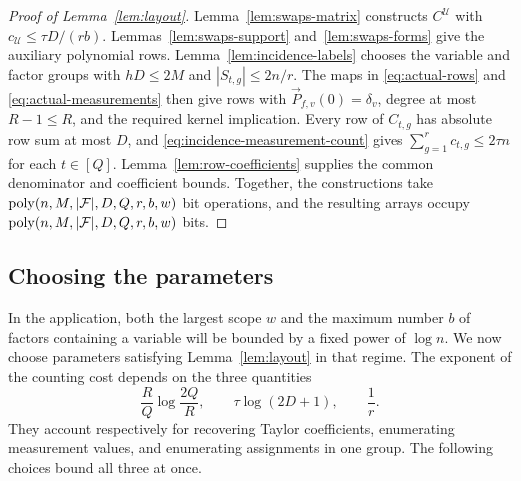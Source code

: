 \begin{proof}[Proof of Lemma~\ref{lem:layout}]
Lemma~\ref{lem:swaps-matrix} constructs $C^{\mathcal U}$ with
$c_{\mathcal U}\le\tau D/(rb)$. Lemmas~\ref{lem:swaps-support}
and~\ref{lem:swaps-forms} give the auxiliary polynomial rows.
Lemma~\ref{lem:incidence-labels} chooses the variable and factor
groups with $hD\le2M$ and $|S_{t,g}|\le2n/r$.
The maps in \eqref{eq:actual-rows} and \eqref{eq:actual-measurements}
then give rows with $\vec{P}_{f,v}(0)=\delta_v$, degree at most $R-1\le R$,
and the required kernel implication. Every row of $C_{t,g}$ has
absolute row sum at most $D$, and \eqref{eq:incidence-measurement-count}
gives $\sum_{g=1}^r c_{t,g}\le2\tau n$ for each $t\in[Q]$.
Lemma~\ref{lem:row-coefficients} supplies the common denominator and
coefficient bounds. Together, the constructions take
$\operatorname{poly}(n,M,|\mathcal F|,D,Q,r,b,w)$ bit operations, and the resulting
arrays occupy $\operatorname{poly}(n,M,|\mathcal F|,D,Q,r,b,w)$ bits.
\end{proof}

\subsection{Choosing the parameters}\label{subsec:incidence-parameters}
In the application, both the largest scope $w$ and the maximum number
$b$ of factors containing a variable will be bounded by a fixed power
of $\log n$. We now choose parameters satisfying
Lemma~\ref{lem:layout} in that regime. The exponent of the counting
cost depends on the three quantities
\[
 \frac RQ\log\frac{2Q}{R},\qquad
 \tau\log(2D+1),\qquad \frac1r.
\]
They account respectively for recovering Taylor coefficients,
enumerating measurement values, and enumerating assignments in one
group. The following choices bound all three at once.

